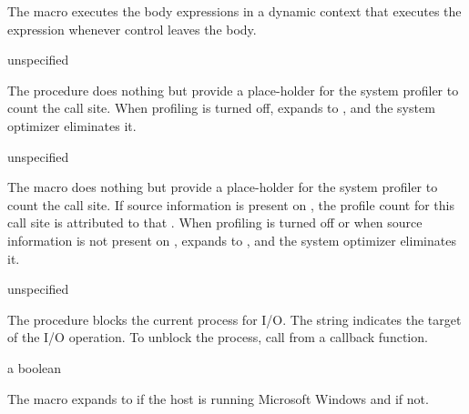 The  macro executes the body expressions 
 \etc{} in a dynamic context that executes the 
expression whenever control leaves the body.

\begin{procedure}
\end{procedure}
\returns{} unspecified

The  procedure does nothing but provide a
place-holder for the system profiler to count the call site. When
profiling is turned off,  expands to
, and the system optimizer eliminates it.

\begin{syntax}
\end{syntax}
\returns{} unspecified

The  macro does nothing but provide a
place-holder for the system profiler to count the call site.
If source information is present on , the profile count
for this call site is attributed to that .
When profiling is turned off or when source information is not
present on ,  expands to
, and the system optimizer eliminates it.

\begin{procedure}
\end{procedure}
\returns{} unspecified

The  procedure blocks the current process for
I/O. The  string indicates the target of the I/O
operation. To unblock the process, call  from a
callback function.

\begin{syntax}
\end{syntax}
\expandsto{} a boolean

The  macro expands to  if the host is running
Microsoft Windows and  if not.


